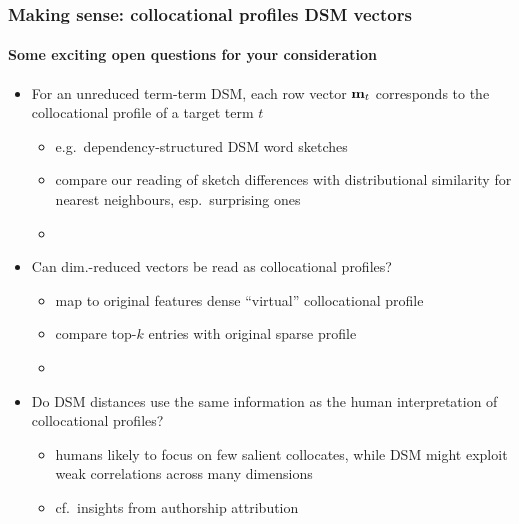 \documentclass[t]{beamer} %
\begin{document}
\begin{frame}
  \frametitle{Making sense: collocational profiles \vs DSM vectors}
  \framesubtitle{Some exciting open questions for your consideration}
  
  \begin{itemize}
  \item For an unreduced term-term DSM, each row vector $\vm_t$ corresponds to the collocational profile of a target term $t$
    \begin{itemize}
    \item e.g.\ dependency-structured DSM \so word sketches
    \item[\hand] compare our reading of sketch differences with distributional similarity for nearest neighbours, esp.\ surprising ones
    \item[]
    \end{itemize}
  \item<2-> Can dim.-reduced vectors be read as collocational profiles?
    \begin{itemize}
    \item map to original features \so dense ``virtual'' collocational profile
    \item compare top-$k$ entries with original sparse profile
    \item[] 
    \end{itemize}
  \item<3-> Do DSM distances use the same information as the human interpretation of collocational profiles?
    \begin{itemize}
    \item humans likely to focus on few salient collocates, while DSM might exploit weak correlations across many dimensions
    \item cf.\ insights from authorship attribution \citep{Evert:etc:17}
    \end{itemize}
  \end{itemize}
\end{frame}
\end{document}
